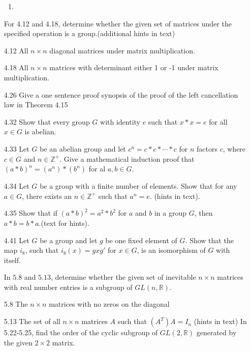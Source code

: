 \documentclass[12pt]{article}
\newcommand{\Z}{\mathds{Z}}
\newcommand{\R}{\mathbb{R}}
\begin{document}
\begin{enumerate}
\begin{enumerate}
				\item 
			\end{enumerate}
			For 4.12 and 4.18, determine whether the given set of matrices under the specified operation is a group.(additional hints in text)
			\item[4.12] All $n \times n$ diagonal matrices under matrix multiplication.
			\item[4.18] All $n \times n$ matrices with determinant either 1 or -1 under matrix multiplication.
			\item[4.26] Give a one sentence proof synopsis of the proof of the left cancellation law in Theorem 4.15
			\item[4.32] Show that every group $G$ with identity $e$ such that $x * x = e$ for all $x \in G$ is abelian.
			\item[4.33] Let $G$ be an abelian group and let $c^n = c* c * \dotsb * c $ for $n$ factors $c$, where $c\in G$ and $n \in \Z^+$. Give a mathematical induction proof that $(a * b)^n = (a^n) * (b^n)$ for al $a,b \in G$.
			\item[4.34] Let $G$ be a group with a finite number of elements. Show that for any $a \in G$, there exists an $n\in \Z^+$ such that $a^n = e$. (hints in text).
			\item[4.35] Show that if $(a  * b)^2 = a^2  * b^2$ for $a$ and $b$ in a group $G$, then $a * b = b  * a$.(text for hints). 
			\item[4.41] Let $G$ be a group and let $g$ be one fixed element of $G$. Show that the map $i_8$, such that $i_8(x) = gxg'$ for $x\in G$, is an isomorphism of $G$ with itself.
		
		In $5.8$ and $5.13$, determine whether the given set of inevitable $n \times n$ matrices with real number entries is a subgroup of $GL(n,\R)$.
			\item[5.8] The $n \times n$ matrices with no zeros on the diagonal
			\item[5.13] The set of all $n \times n$ matrices $A$ such that $(A^T)A=I_n$ (hints in text)
		In 5.22-5.25, find the order of the cyclic subgroup of $GL(2,\R)$ generated by the given $2 \times 2$ matrix. 
		

\end{enumerate}
\end{document}
